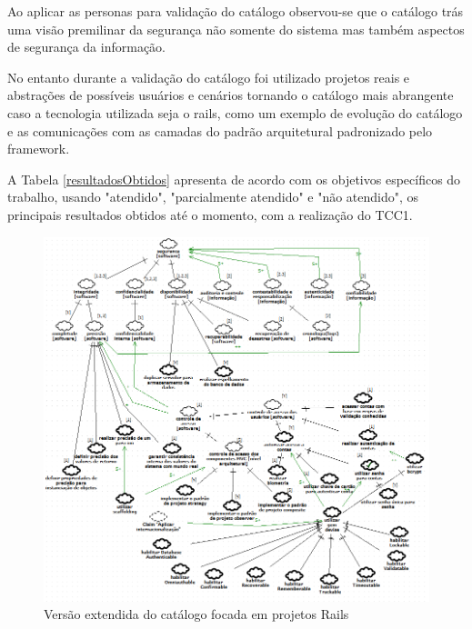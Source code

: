 Ao aplicar as personas para validação do catálogo observou-se que o catálogo trás uma visão premilinar da segurança não somente do sistema mas também aspectos de segurança da informação.

No entanto durante a validação do catálogo foi utilizado projetos reais e abstrações de possíveis usuários e cenários tornando o catálogo mais abrangente caso a tecnologia utilizada seja o rails, como um exemplo de evolução do catálogo e as comunicações com as camadas do padrão arquitetural padronizado pelo framework. 

A Tabela \ref{resultadosObtidos} apresenta de acordo com os objetivos específicos do trabalho, usando "atendido", "parcialmente atendido" e "não atendido", os principais resultados obtidos até o momento, com a realização do TCC1.


\begin{figure}[h!]
	\centering
	\includegraphics[keepaspectratio=true,scale=0.7]{figuras/catalogoFull.PNG}
	\caption{Versão extendida do catálogo focada em projetos Rails}
	\label{catalogoFull}
\end{figure}





